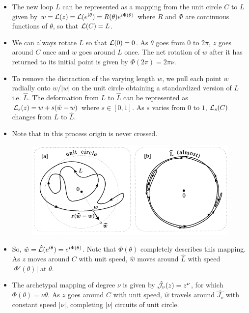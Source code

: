 \documentclass[12pt]{article}
\def\mc{\ensuremath\mathcal}
\begin{document}
\begin{itemize}
\begin{itemize}
\begin{figure}[h!]
            \label{f2}
        \end{figure}
        \item The new loop $L$ can be represented as a mapping from the unit circle $C$ to $L$ given by $w = \mc{L}(z) = \mc{L}(e^{i\theta}) = R(\theta)e^{i\Phi(\theta)}$ where $R$ and $\Phi$ are continuous functions of $\theta$, so that $\mc{L}(C)=L$.
        \item We can always rotate $L$ so that $\mc{L}(0) = 0$. As $\theta$ goes from $0$ to $2\pi$, $z$ goes around $C$ once and $w$ goes around $L$ once. The net rotation of $w$ after it has returned to its initial point is given by $\Phi(2\pi) = 2\pi\nu$.
        \item To remove the distraction of the varying length $w$, we pull each point $w$ radially onto $w/|w|$ on the unit circle obtaining a standardized version of $L$ i.e. $\hat{L}$. The deformation from $L$ to $\hat{L}$ can be represented as $\mc{L}_{s}(z) = w + s(\hat{w}-w)$ where $s \in [0,1]$. As $s$ varies from $0$ to $1$, $\mc{L}_{s}(C)$ changes from $L$ to $\hat{L}$.
        \item Note that in this process origin is never crossed.
        \begin{figure}[h!]
            \centering
            \includegraphics[scale=0.7]{fig_3}
            \label{f3}
        \end{figure}
        \item So, $\hat{w} = \hat{\mc{L}}(e^{i\theta}) = e^{i\Phi(\theta)}$. Note that $\Phi(\theta)$ completely describes this mapping. As $z$ moves around $C$ with unit speed, $\hat{w}$ moves around $\hat{L}$ with speed $|\Phi'(\theta)|$ at $\theta$.
        \item The archetypal mapping of degree $\nu$ is given by $\hat{\mc{J}_{\nu}}(z)=z^{\nu}$, for which $\Phi(\theta)=\nu\theta$. As $z$ goes around $C$ with unit speed, $\hat{w}$ travels around $\hat{J_{\nu}}$ with constant speed $|\nu|$, completing $|\nu|$ circuits of unit circle.

\end{itemize}
\end{itemize}
\end{document}
